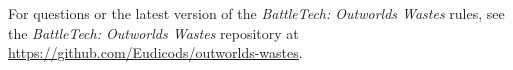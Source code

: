 For questions or the latest version of the \emph{BattleTech: Outworlds Wastes} rules, see the \emph{BattleTech: Outworlds Wastes} repository at \href{https://github.com/Eudicods/outworlds-wastes}{https://github.com/Eudicods/outworlds-wastes}.
